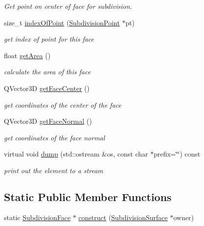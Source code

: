 \begin{DoxyCompactItemize}
\begin{DoxyCompactList}\small\item\em Get point on center of face for subdivision. \end{DoxyCompactList}\item 
size\-\_\-t \hyperlink{classShipCAD_1_1SubdivisionFace_a8b32525b95c836e065cb124a61caec61}{index\-Of\-Point} (\hyperlink{classShipCAD_1_1SubdivisionPoint}{Subdivision\-Point} $\ast$pt)
\begin{DoxyCompactList}\small\item\em get index of point for this face \end{DoxyCompactList}\item 
float \hyperlink{classShipCAD_1_1SubdivisionFace_ace99f0fe3b54e57912e5391e0aff84ea}{get\-Area} ()
\begin{DoxyCompactList}\small\item\em calculate the area of this face \end{DoxyCompactList}\item 
Q\-Vector3\-D \hyperlink{classShipCAD_1_1SubdivisionFace_a3574fd6a4241a81faa7f2ff741d07811}{get\-Face\-Center} ()
\begin{DoxyCompactList}\small\item\em get coordinates of the center of the face \end{DoxyCompactList}\item 
Q\-Vector3\-D \hyperlink{classShipCAD_1_1SubdivisionFace_add361089333f9d08a411d16ea1782246}{get\-Face\-Normal} ()
\begin{DoxyCompactList}\small\item\em get coordinates of the face normal \end{DoxyCompactList}\item 
virtual void \hyperlink{classShipCAD_1_1SubdivisionFace_aa5bd261ae5fc0a1c7fe8cc5328b8477f}{dump} (std\-::ostream \&os, const char $\ast$prefix=\char`\"{}\char`\"{}) const 
\begin{DoxyCompactList}\small\item\em print out the element to a stream \end{DoxyCompactList}\end{DoxyCompactItemize}
\subsection*{Static Public Member Functions}
\begin{DoxyCompactItemize}
\item 
static \hyperlink{classShipCAD_1_1SubdivisionFace}{Subdivision\-Face} $\ast$ \hyperlink{classShipCAD_1_1SubdivisionFace_a4a6f182fa7e5cf63fc95c7614805f136}{construct} (\hyperlink{classShipCAD_1_1SubdivisionSurface}{Subdivision\-Surface} $\ast$owner)
\end{DoxyCompactItemize}
